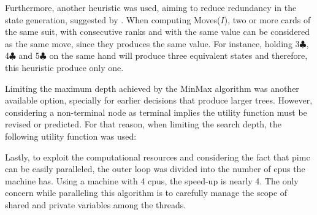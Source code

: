 Furthermore, another heuristic was used, aiming to reduce redundancy in the state generation, suggested by \citet{Buro}.
When computing Moves($I$), two or more cards of the same suit, with consecutive ranks and with the same value can be considered as the same move, since they produces the same value.
For instance, holding 3$\clubsuit$, 4$\clubsuit$ and 5$\clubsuit$ on the same hand will produce three equivalent states and therefore, this heuristic produce only one.

Limiting the maximum depth achieved by the MinMax algorithm was another available option, specially for earlier decisions that produce larger trees.
However, considering a non-terminal node as terminal implies the utility function must be revised or predicted.
For that reason, when limiting the search depth, the following utility function was used:

Lastly, to exploit the computational resources and considering the fact that \ac{pimc} can be easily paralleled, the outer loop was divided into the number of \acp{cpu} the machine has.
Using a machine with 4 \acp{cpu}, the speed-up is nearly 4.
The only concern while paralleling this algorithm is to carefully manage the scope of shared and private variables among the threads.















